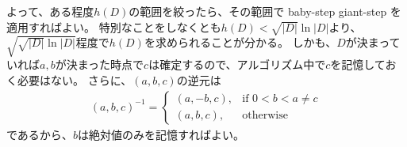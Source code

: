 よって、ある程度$h(D)$の範囲を絞ったら、その範囲で baby-step giant-step を適用すればよい。
特別なことをしなくとも$h(D) < \sqrt{|D|}\ln{|D|}$より、$\sqrt{\sqrt{|D|}\ln{|D|}}$程度で$h(D)$を求められることが分かる。
しかも、$D$が決まっていれば$a,b$が決まった時点で$c$は確定するので、アルゴリズム中で$c$を記憶しておく必要はない。
さらに、$(a,b,c)$の逆元は
\begin{align*}
(a,b,c)^{-1} =
\begin{cases}
(a, -b, c), &\mbox{if } 0 < b < a \neq c\\
(a, b, c), &\mbox{otherwise}
\end{cases}
\end{align*}
であるから、$b$は絶対値のみを記憶すればよい。

